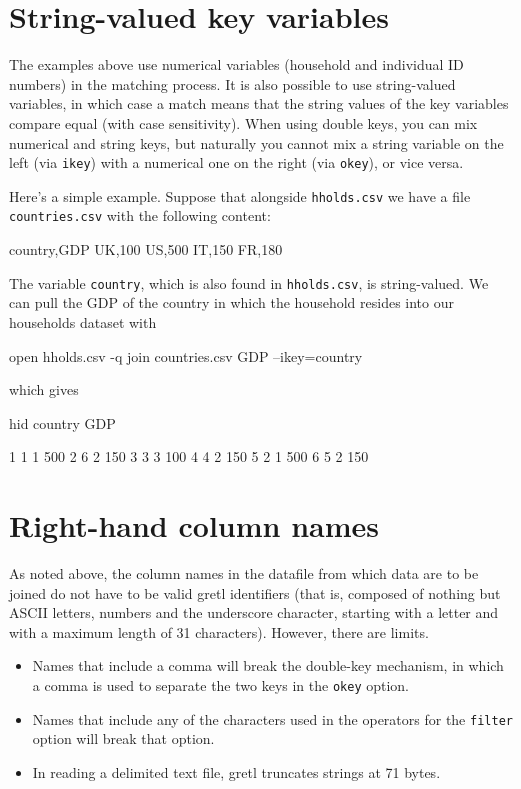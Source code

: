 \section{String-valued key variables}
\label{sec:join-strings}

The examples above use numerical variables (household and individual
ID numbers) in the matching process. It is also possible to use
string-valued variables, in which case a match means that the string
values of the key variables compare equal (with case sensitivity). 
When using double keys, you can mix numerical and string keys, but
naturally you cannot mix a string variable on the left (via
\texttt{ikey}) with a numerical one on the right (via \texttt{okey}),
or vice versa.

Here's a simple example. Suppose that alongside \texttt{hholds.csv} we
have a file \texttt{countries.csv} with the following content:
\begin{code}
 country,GDP
 UK,100
 US,500
 IT,150
 FR,180
\end{code}

The variable \texttt{country}, which is also found in
\texttt{hholds.csv}, is string-valued. We can pull the GDP of the
country in which the household resides into our households dataset
with
\begin{code}
open hholds.csv -q
join countries.csv GDP --ikey=country
\end{code}
which gives
\begin{code}
           hid      country          GDP

1            1            1          500
2            6            2          150
3            3            3          100
4            4            2          150
5            2            1          500
6            5            2          150
\end{code}

\section{Right-hand column names}
\label{sec:join-colnames}

As noted above, the column names in the datafile from which data
are to be joined do not have to be valid gretl identifiers (that
is, composed of nothing but ASCII letters, numbers and the underscore
character, starting with a letter and with a maximum length of 31
characters). However, there are limits. 
\begin{itemize}
\item Names that include a comma will break the double-key
  mechanism, in which a comma is used to separate the two keys in
  the \texttt{okey} option.
\item Names that include any of the characters used in the operators
  for the \texttt{filter} option will break that option.
\item In reading a delimited text file, gretl truncates strings at
  71 bytes. 
\end{itemize}

